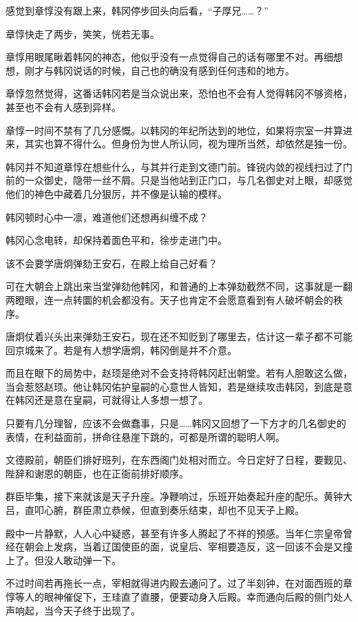 感觉到章惇没有跟上来，韩冈停步回头向后看，“子厚兄……？”

章惇快走了两步，笑笑，恍若无事。

章惇用眼尾瞅着韩冈的神态，他似乎没有一点觉得自己的话有哪里不对。再细想想，刚才与韩冈说话的时候，自己也的确没有感到任何违和的地方。

章惇忽然觉得，这番话韩冈若是当众说出来，恐怕也不会有人觉得韩冈不够资格，甚至也不会有人感到异样。

章惇一时间不禁有了几分感慨。以韩冈的年纪所达到的地位，如果将宗室一并算进来，其实也算不得什么。但身份为世人所认同，视为理所当然，却依然是独一份。

韩冈并不知道章惇在想些什么，与其并行走到文德门前。锋锐内敛的视线扫过了门前的一众御史，隐带一丝不屑。只是当他站到正门口，与几名御史对上眼，却感觉他们的神色中藏着几分狠厉，并不像是认输的模样。

韩冈顿时心中一凛，难道他们还想再纠缠不成？

韩冈心念电转，却保持着面色平和，徐步走进门中。

该不会要学唐炯弹劾王安石，在殿上给自己好看？

可在大朝会上跳出来当堂弹劾他韩冈，和普通的上本弹劾截然不同，这事就是一翻两瞪眼，连一点转圜的机会都没有。天子也肯定不会愿意看到有人破坏朝会的秩序。

唐炯仗着兴头出来弹劾王安石，现在还不知贬到了哪里去，估计这一辈子都不可能回京城来了。若是有人想学唐炯，韩冈倒是并不介意。

而且在眼下的局势中，赵顼是绝对不会支持将韩冈赶出朝堂。若有人胆敢这么做，当会惹怒赵顼。他让韩冈佑护皇嗣的心意世人皆知，若是继续攻击韩冈，到底是意在韩冈还是意在皇嗣，可就得让人多想一想了。

只要有几分理智，应该不会做蠢事，只是……韩冈又回想了一下方才的几名御史的表情，在利益面前，拼命往悬崖下跳的，可都是所谓的聪明人啊。

文德殿前，朝臣们排好班列，在东西阁门处相对而立。今日定好了日程，要觐见、陛辞和谢恩的朝臣，也在正衙前排好顺序。

群臣毕集，接下来就该是天子升座。净鞭响过，乐班开始奏起升座的配乐。黄钟大吕，直叩心腑，群臣肃立恭候，但直到奏乐结束，却也不见天子上殿。

殿中一片静默，人人心中疑惑，甚至有许多人腾起了不祥的预感。当年仁宗皇帝曾经在朝会上发病，当着辽国使臣的面，说皇后、宰相要造反，这一回该不会是又撞上了。但没人敢动弹一下。

不过时间若再拖长一点，宰相就得进内殿去通问了。过了半刻钟，在对面西班的章惇等人的眼神催促下，王珪直了直腰，便要动身入后殿。幸而通向后殿的侧门处人声响起，当今天子终于出现了。

